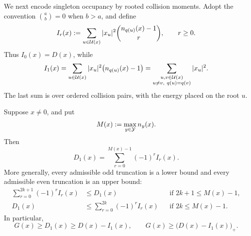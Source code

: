 We next encode singleton occupancy by rooted collision moments.  Adopt the
convention \(\binom ab=0\) when \(b>a\), and define
\begin{equation}
 I_r(x):=
 \sum_{u\in\mathcal U(x)}|x_u|^2
 \binom{n_{q(u)}(x)-1}{r},
 \qquad r\ge0.
 \label{eq:tpc57-rooted-collision-moments}
\end{equation}
Thus \(I_0(x)=D(x)\), while
\begin{equation}
 I_1(x)
 =\sum_{u\in\mathcal U(x)}|x_u|^2
   \bigl(n_{q(u)}(x)-1\bigr)
 =\sum_{\substack{u,v\in\mathcal U(x)\\u\ne v,\ q(u)=q(v)}}|x_u|^2.
 \label{eq:tpc57-first-rooted-collision}
\end{equation}
The last sum is over ordered collision pairs, with the energy placed on the
root \(u\).

\begin{theorem}
\label{thm:tpc57-collision-moment-expansion}
Suppose \(x\ne0\), and put
\begin{equation}
 M(x):=\max_{y\in\mathcal Y}n_y(x).
 \label{eq:tpc57-max-active-multiplicity}
\end{equation}
Then
\begin{equation}
 \boxed{
 D_1(x)=\sum_{r=0}^{M(x)-1}(-1)^r I_r(x).}
 \label{eq:tpc57-exact-singleton-expansion}
\end{equation}
More generally, every admissible odd truncation is a lower bound and every
admissible even truncation is an upper bound:
\begin{align}
 \sum_{r=0}^{2k+1}(-1)^rI_r(x)
 &\le D_1(x)
 &&\text{if }2k+1\le M(x)-1,
 \label{eq:tpc57-bonferroni-lower}\\
 D_1(x)
 &\le\sum_{r=0}^{2k}(-1)^rI_r(x)
 &&\text{if }2k\le M(x)-1.
 \label{eq:tpc57-bonferroni-upper}
\end{align}
In particular,
\begin{equation}
 \boxed{
 G(x)\ge D_1(x)\ge D(x)-I_1(x),}
 \qquad
 G(x)\ge\bigl(D(x)-I_1(x)\bigr)_+.
 \label{eq:tpc57-first-collision-floor}
\end{equation}
\end{theorem}


